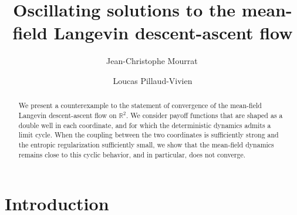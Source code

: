 \documentclass[11pt]{amsart}
\theoremstyle{remark}
\theoremstyle{definition}
\numberwithin{equation}{section}
\numberwithin{proposition}{section}
\newcommand{\R}{\mathbb{R}}
\newcommand{\1}{\mathbf{1}}
\begin{document}
\author[Jean-Christophe Mourrat]{Jean-Christophe Mourrat\,}
\address[Jean-Christophe Mourrat]{Department of Mathematics, ENS Lyon and CNRS, Lyon, France}

\author{Loucas Pillaud-Vivien}
\address[Loucas Pillaud-Vivien]{CERMICS, CNRS, ENPC, Institut Polytechnique de Paris, Marne-la-Vallée, France}


\keywords{}
\subjclass[2010]{}
\date{}



\title[Oscillating solutions to MFL-DA]{Oscillating solutions to the mean-field Langevin descent-ascent flow}

\begin{abstract}
We present a counterexample to the statement of convergence of the mean-field Langevin descent-ascent flow on $\R^2$. We consider payoff functions that are shaped as a double well in each coordinate, and for which the deterministic dynamics admits a limit cycle. When the coupling between the two coordinates is sufficiently strong and the entropic regularization sufficiently small, we show that the mean-field dynamics remains close to this cyclic behavior, and in particular, does not converge.
\end{abstract}


\maketitle



%
%
%
%
%
%

\section{Introduction}
\label{s.intro}
\end{document}
